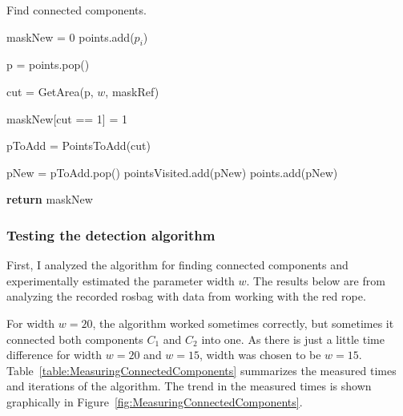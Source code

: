             \begin{algorithm}
                \caption{Find connected components.}\label{alg:ConnectedComponents}
                \begin{algorithmic}[1]


                \State maskNew = 0 
                \State points.add($p_i$) 

                    \State p = points.pop()

                    \State cut = GetArea(p, $w$, maskRef) 

                    \State maskNew[cut == 1] = 1 

                    \State pToAdd = PointsToAdd(cut) 

                        pNew = pToAdd.pop()
                         
                            \State pointsVisited.add(pNew)
                            \State points.add(pNew)
                        \EndIf
                    \EndWhile

                \EndWhile

                \State \textbf{return} maskNew

                \EndProcedure
                \end{algorithmic}
            \end{algorithm}

        \subsubsection{Testing the detection algorithm}

            First, I analyzed the algorithm for finding connected components and experimentally estimated the parameter width $w$. The results below are from analyzing the recorded rosbag with data from working with the red rope.

            For width $w = 20$, the algorithm worked sometimes correctly, but sometimes it connected both components $C_1$ and $C_2$ into one. As there is just a little time difference for width $w=20$ and $w=15$, width was chosen to be $w=15$. Table~\ref{table:MeasuringConnectedComponents} summarizes the measured times and iterations of the algorithm. The trend in the measured times is shown graphically in Figure~\ref{fig:MeasuringConnectedComponents}.

